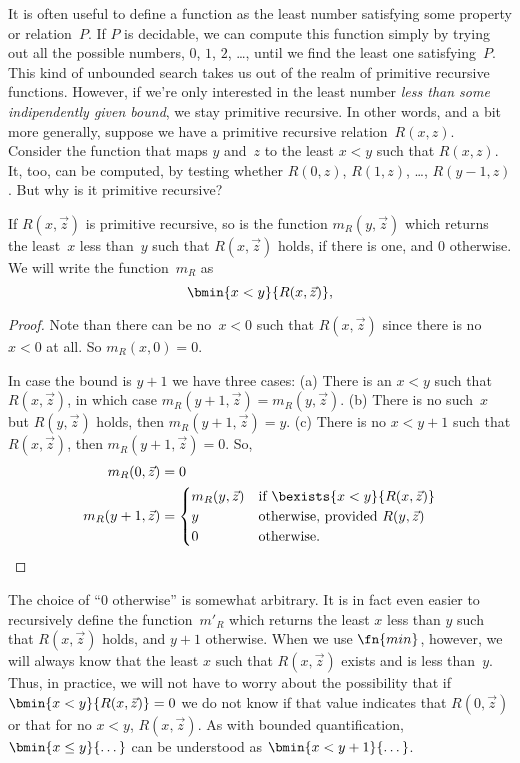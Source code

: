 \documentclass[../../../include/open-logic-section]{subfiles}
\begin{document}

\begin{explain}
It is often useful to define a function as the least number satisfying
some property or relation~$P$. If $P$ is decidable, we can compute
this function simply by trying out all the possible numbers, $0$, $1$,
$2$, \dots, until we find the least one satisfying~$P$.  This kind of
unbounded search takes us out of the realm of primitive recursive
functions. However, if we're only interested in the least number
\emph{less than some indipendently given bound}, we stay primitive
recursive. In other words, and a bit more generally, suppose we have a
primitive recursive relation~$R(x,z)$. Consider the function that maps
$y$ and~$z$ to the least $x < y$ such that $R(x, z)$. It, too, can be
computed, by testing whether $R(0,z)$, $R(1, z)$, \dots, $R(y-1,z)$.
But why is it primitive recursive?
\end{explain}

\begin{prop}
If $R(x, \vec z)$ is primitive recursive, so is the function $m_R(y,
\vec{z})$ which returns the least~$x$ less than~$y$ such that
$R(x,\vec{z})$ holds, if there is one, and $0$ otherwise.  We will write
the function~$m_R$ as
\[
\bmin{x < y}{R(x, \vec{z})},
\]
\end{prop}

\begin{proof}
Note than there can be no~$x < 0$ such that $R(x, \vec{z})$ since
there is no $x < 0$ at all.  So $m_R(x, 0) = 0$.

In case the bound is $y + 1$ we have three cases: (a) There is an $x <
y$ such that $R(x, \vec{z})$, in which case $m_R(y+1, \vec{z}) =
m_R(y, \vec{z})$. (b) There is no such~$x$ but $R(y, \vec{z})$ holds, then
$m_R(y+1, \vec{z}) = y$. (c) There is no $x < y+1$ such that $R(x,
\vec{z})$, then $m_R(y+1,\vec{z}) = 0$. So,
\begin{align*}
m_R(0, \vec{z}) & = 0\\
m_R(y+1, \vec{z}) & =
\begin{cases}
m_R(y, \vec{z}) & \text{if $\bexists{x < y}{R(x, \vec{z})}$} \\
y & \text{otherwise, provided $R(y, \vec{z})$}\\
0 & \text{otherwise.}
\end{cases}
\end{align*}
\end{proof}

\begin{explain}
The choice of ``$0$ otherwise'' is somewhat arbitrary. It is in fact
even easier to recursively define the function~$m'_R$ which returns
the least $x$ less than $y$ such that $R(x,\vec z)$ holds, and $y+1$
otherwise.  When we use $\fn{min}$, however, we will always know that
the least $x$ such that $R(x, \vec z)$ exists and is less
than~$y$. Thus, in practice, we will not have to worry about the
possibility that if $\bmin{x<y}{R(x, \vec{z})} = 0$ we do not know if that
value indicates that $R(0, \vec z)$ or that for no $x < y$, $R(x, \vec
z)$. As with bounded quantification, $\bmin{x \leq y}{\dots}$
can be understood as $\bmin{x < y + 1}{\dots}$.
\end{explain}
\end{document}
